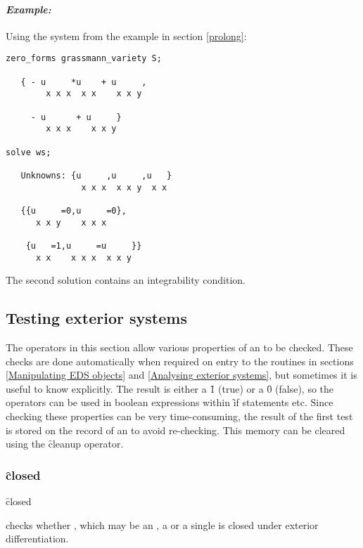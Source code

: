 \paragraph{\textit{Example:}}
Using the system from the example in section \ref{prolong}:
\begin{verbatim}
zero_forms grassmann_variety S;

   { - u     *u    + u     ,
        x x x  x x    x x y

     - u      + u     }
        x x x    x x y

solve ws;

   Unknowns: {u     ,u     ,u   }
               x x x  x x y  x x

   {{u     =0,u     =0},
      x x y    x x x

    {u   =1,u     =u     }}
      x x    x x x  x x y
\end{verbatim}
The second solution contains an integrability condition.



\subsection{Testing exterior systems}
\label{Testing exterior systems}

The operators in this section allow various properties of an  to
be checked. These checks are done automatically when required on entry to
the routines in sections \ref{Manipulating EDS objects} and \ref{Analysing
exterior systems}, but sometimes it is useful to know explicitly. The
result is either a \f{1} (true) or a \f{0} (false), so the operators can be
used in boolean expressions within \f{if} statements etc.  Since checking
these properties can be very time-consuming, the result of the first test
is stored on the  record of an  to avoid
re-checking. This memory can be cleared using the \f{cleanup} operator.

\subsubsection{\f{closed}}
\label{closed}

\hypertarget{operator:CLOSED}{}
\begin{syntax}
	\f{closed} 
\end{syntax}
checks whether , which may be an , a  or a
single  is closed under exterior differentiation.

